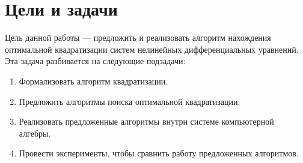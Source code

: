 
\section{Цели и задачи}

Цель данной работы --- предложить и реализовать алгоритм нахождения оптимальной квадратизации систем нелинейных дифференциальных уравнений. Эта задача разбивается на следующие подзадачи:

\begin{enumerate}
    \item Формализовать алгоритм квадратизации.
    \item Предложить алгоритмы поиска оптимальной квадратизации.
    \item Реализовать предложенные алгоритмы внутри системе компьютерной алгебры.
    \item Провести эксперименты, чтобы сравнить работу предложенных алгоритмов.
\end{enumerate}
